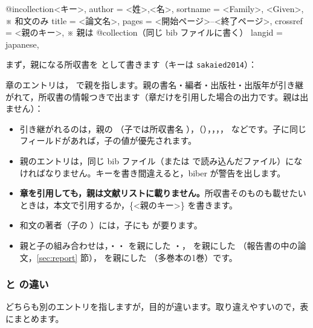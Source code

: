 \begin{bibtemplate}
@incollection{<キー>,
  author   = {<姓>,<名>},
  sortname = {<Family>, <Given>},   ※ 和文のみ
  title    = {<論文名>},
  pages    = {<開始ページ>--<終了ページ>},
  crossref = {<親のキー>},          ※ 親は @collection（同じ bib ファイルに書く）
  langid   = {japanese},
}
\end{bibtemplate}

まず，親になる所収書を  として書きます（キーは \texttt{sakaied2014}）：


章のエントリは， で親を指します。親の書名・編者・出版社・出版年が引き継がれて，所収書の情報つきで出ます（章だけを引用した場合の出力です。親は出ません）：


\begin{itemize}
\item 引き継がれるのは，親の （子では所収書名 ），（），，，， などです。子に同じフィールドがあれば，子の値が優先されます。
\item 親のエントリは，同じ bib ファイル（または  で読み込んだファイル）になければなりません。キーを書き間違えると，biber が警告を出します。
\item \textbf{章を引用しても，親は文献リストに載りません。}所収書そのものも載せたいときは，本文で引用するか，\{<親のキー>\} を書きます。
\item 和文の著者（子の ）には，子にも  が要ります。
\item 親と子の組み合わせは，・・ を親にした ・， を親にした （報告書の中の論文，\ref{sec:report} 節）， を親にした （多巻本の1巻）です。
\end{itemize}

\subsubsection{ と  の違い}\label{sec:related}
どちらも別のエントリを指しますが，目的が違います。取り違えやすいので，表にまとめます。

